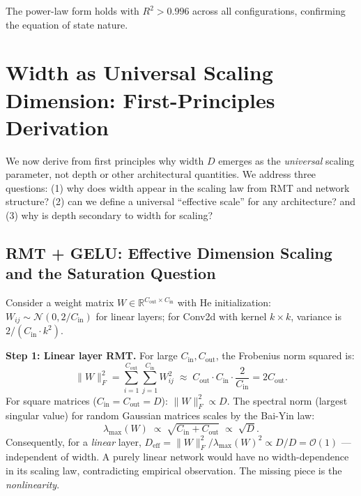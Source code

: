 \documentclass[11pt, a4paper]{article}
\theoremstyle{plain}
\begin{document}
The power-law form holds with $R^2 > 0.996$ across all configurations, confirming the equation of state nature.

\section{Width as Universal Scaling Dimension: First-Principles Derivation}
\label{sec:width_first_principles}

We now derive from first principles why width $D$ emerges as the \emph{universal} scaling parameter, not depth or other architectural quantities. We address three questions: (1) why does width appear in the scaling law from RMT and network structure? (2) can we define a universal ``effective scale'' for any architecture? and (3) why is depth secondary to width for scaling?

\subsection{RMT + GELU: Effective Dimension Scaling and the Saturation Question}

Consider a weight matrix $W \in \mathbb{R}^{C_{\mathrm{out}} \times C_{\mathrm{in}}}$ with He initialization: $W_{ij} \sim \mathcal{N}(0, 2/C_{\mathrm{in}})$ for linear layers; for Conv2d with kernel $k \times k$, variance is $2/(C_{\mathrm{in}} \cdot k^2)$.

\medskip\noindent\textbf{Step 1: Linear layer RMT.} For large $C_{\mathrm{in}}, C_{\mathrm{out}}$, the Frobenius norm squared is:
\begin{equation}
\|W\|_F^2 = \sum_{i=1}^{C_{\mathrm{out}}} \sum_{j=1}^{C_{\mathrm{in}}} W_{ij}^2 \;\approx\; C_{\mathrm{out}} \cdot C_{\mathrm{in}} \cdot \frac{2}{C_{\mathrm{in}}} = 2C_{\mathrm{out}}.
\end{equation}
For square matrices ($C_{\mathrm{in}} = C_{\mathrm{out}} = D$): $\|W\|_F^2 \propto D$. The spectral norm (largest singular value) for random Gaussian matrices scales by the Bai-Yin law:
\begin{equation}
\lambda_{\max}(W) \;\propto\; \sqrt{C_{\mathrm{in}} + C_{\mathrm{out}}} \;\propto\; \sqrt{D}.
\end{equation}
Consequently, for a \emph{linear} layer, $D_{\mathrm{eff}} = \|W\|_F^2 / \lambda_{\max}(W)^2 \propto D / D = \mathcal{O}(1)$ --- independent of width. A purely linear network would have no width-dependence in its scaling law, contradicting empirical observation. The missing piece is the \emph{nonlinearity}.
\end{document}
